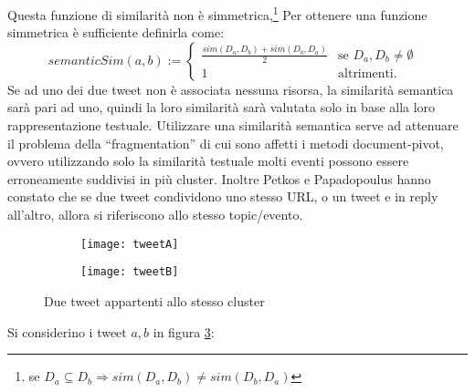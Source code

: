 Questa funzione di similarità non è simmetrica,\footnote{se $D_a\subseteq D_b\Rightarrow sim(D_a,D_b)\neq sim(D_b,D_a) $}
Per ottenere una funzione simmetrica è sufficiente definirla come: 
\begin{equation*} 
semanticSim(a,b):= 
\begin{cases}
\frac{sim(D_a,D_b)+sim(D_b,D_a)}{2} & \text{se $D_a,D_b\neq \emptyset$ }\\
1& \text{altrimenti.}

\end{cases}
\end{equation*}
Se ad uno dei due tweet non è associata nessuna risorsa, la similarità semantica sarà pari ad uno, quindi la loro similarità sarà valutata  solo in base alla loro rappresentazione testuale.
Utilizzare una similarità semantica serve ad attenuare il problema della “fragmentation” di cui sono affetti i metodi document-pivot, ovvero utilizzando solo la similarità testuale molti eventi possono essere erroneamente suddivisi in più cluster.  Inoltre Petkos e Papadopoulus \cite{DBLP:conf/www/PetkosPK14}  hanno constato che se due tweet condividono uno stesso URL, o  un tweet e in reply all’altro, allora si riferiscono allo stesso topic/evento.
 
\begin{figure}
    \centering
    \begin{subfigure}[b]{0.45\textwidth}
        \centering
        \texttt{[image: tweetA]}
        \caption{}
        \label{fig:tweeta}
    \end{subfigure}
    \hfill
    \begin{subfigure}[b]{0.45\textwidth}
        \centering
        \texttt{[image: tweetB]}
       \caption{}
        \label{fig:tweetb}
    \end{subfigure}
    \hfill
    
    \caption{Due tweet appartenti allo stesso cluster}
    \label{fig:twotweets}
\end{figure} 
Si considerino i tweet $a,b$ in figura \ref{fig:twotweets}:

